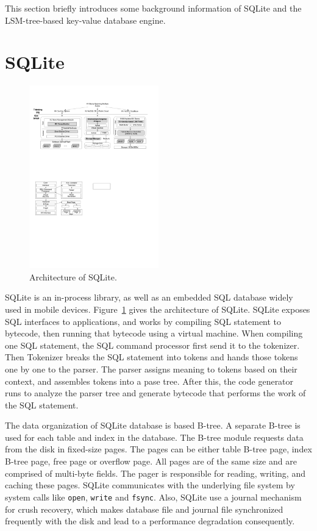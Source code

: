 This section briefly introduces some background information of SQLite and the LSM-tree-based key-value database engine.

\section{SQLite}

\begin{figure}[h]
	\begin{centering}
		\includegraphics[width=0.5\textwidth]{pic/SQLite.pdf}
		\caption{Architecture of SQLite.}
		\label{fig:SQLite}
	\end{centering}
\end{figure}
SQLite is an in-process library, as well as an embedded SQL database widely used in mobile devices. Figure~\ref{fig:SQLite} gives the architecture of SQLite. SQLite exposes SQL interfaces to applications, and works by compiling SQL statement to bytecode, then running that bytecode using a virtual machine. When compiling one SQL statement, the SQL command processor first send it to the tokenizer. Then Tokenizer breaks the SQL statement into tokens and hands those tokens one by one to the parser. The parser assigns meaning to tokens based on their context, and assembles tokens into a pase tree. After this, the code generator runs to analyze the parser tree and generate bytecode that performs the work of the SQL statement.

The data organization of SQLite database is based B-tree. A separate B-tree is used for each table and index in the database. The B-tree module requests data from the disk in fixed-size pages. The pages can be either table B-tree page, index B-tree page, free page or overflow page. All pages are of the same size and are comprised of multi-byte fields. The pager is responsible for reading, writing, and caching these pages. SQLite communicates with the underlying file system by system
calls like {\tt open}, {\tt write} and {\tt fsync}. Also, SQLite use a journal mechanism for crush recovery, which makes database
file and journal file synchronized frequently with the disk and lead to a performance degradation consequently.


